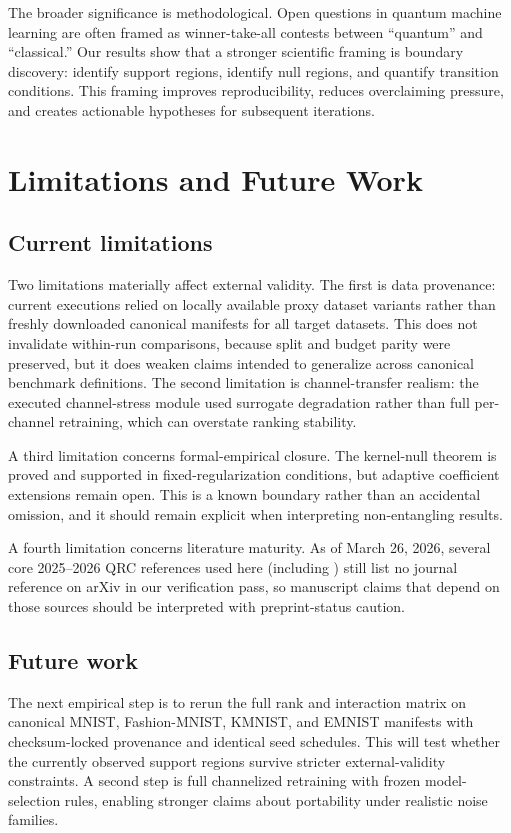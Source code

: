 \documentclass{article} %
\begin{document}
The broader significance is methodological. Open questions in quantum machine learning are often framed as winner-take-all contests between ``quantum'' and ``classical.'' Our results show that a stronger scientific framing is boundary discovery: identify support regions, identify null regions, and quantify transition conditions. This framing improves reproducibility, reduces overclaiming pressure, and creates actionable hypotheses for subsequent iterations.

\section{Limitations and Future Work}\label{sec:limitations}
\subsection{Current limitations}
Two limitations materially affect external validity. The first is data provenance: current executions relied on locally available proxy dataset variants rather than freshly downloaded canonical manifests for all target datasets. This does not invalidate within-run comparisons, because split and budget parity were preserved, but it does weaken claims intended to generalize across canonical benchmark definitions. The second limitation is channel-transfer realism: the executed channel-stress module used surrogate degradation rather than full per-channel retraining, which can overstate ranking stability.

A third limitation concerns formal-empirical closure. The kernel-null theorem is proved and supported in fixed-regularization conditions, but adaptive coefficient extensions remain open. This is a known boundary rather than an accidental omission, and it should remain explicit when interpreting non-entangling results.

A fourth limitation concerns literature maturity. As of March 26, 2026, several core 2025--2026 QRC references used here (including \citealp{S001,S002,S023,S024,S037,S038,S039}) still list no journal reference on arXiv in our verification pass, so manuscript claims that depend on those sources should be interpreted with preprint-status caution.

\subsection{Future work}
The next empirical step is to rerun the full rank and interaction matrix on canonical MNIST, Fashion-MNIST, KMNIST, and EMNIST manifests with checksum-locked provenance and identical seed schedules. This will test whether the currently observed support regions survive stricter external-validity constraints. A second step is full channelized retraining with frozen model-selection rules, enabling stronger claims about portability under realistic noise families.
\end{document}
